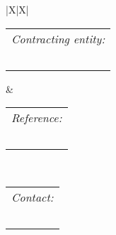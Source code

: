 \begin{tabularx}{\linewidth}{|X|X|}
\hline
\begin{tabular}[t]{@{}l@{}}
\tiny\it{Contracting entity:}\\
\DCContractingEntity\
\end{tabular} &
\begin{tabular}[t]{@{}l@{}}
\tiny\it{Reference:}\\
\DCContractingEntityReference\
\end{tabular}\\
\hline
{}
{\begin{tabular}[t]{@{}l@{}}
\tiny\it{Contact:}\\
\DCContractingEntityContact\
\end{tabular}}\\
\hline
\end{tabularx}

\vspace*{1.5cm}

\pagebreak